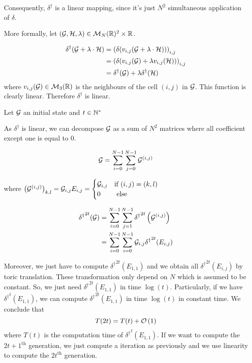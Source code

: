 Consequently, $\delta^\dagger$ is a linear mapping, since it's just $N^2$ simultaneous application of $\delta$.

More formally, let $(\mathcal{G},\mathcal{H},\lambda) \in \mathcal{M}_N(\mathbb{R})^2\times \mathbb{R}$.

$$
    \begin{aligned}
        \delta^\dagger(\mathcal{G}+\lambda\cdot\mathcal{H}) &= \left( \delta(v_{i,j}(\mathcal{G}+\lambda\cdot\mathcal{H})) \right)_{i,j}\\
        &= \left( \delta(v_{i,j}(\mathcal{G})+\lambda v_{i,j}(\mathcal{H})) \right)_{i,j}\\
        &= \delta^\dagger(\mathcal{G})+\lambda \delta^\dagger(\mathcal{H})
    \end{aligned}
$$
where $v_{i,j}(\mathcal{G}) \in \mathcal{M}_3(\mathbb{R})$ is the neighbours of the cell $(i,j)$ in $\mathcal{G}$. This function is clearly linear. Therefore $\delta^\dagger$ is linear.

Let $\mathcal{G}$ an initial state and $t\in\mathbb{N}^*$

As $\delta^\dagger$ is linear, we can decompose $\mathcal{G}$ as a sum of $N^2$ matrices where all coefficient except one is equal to 0. 

$$
    \mathcal{G}=\sum\limits_{i=0}^{N-1}\sum\limits_{j=0}^{N-1} \mathcal{G}^{(i,j)}
$$

where $\left(\mathcal{G}^{(i,j)}\right)_{k,l}=\mathcal{G}_{i,j}E_{i,j}=\begin{cases} \mathcal{G}_{i,j} & \text{if }(i,j)=(k,l)\\0&\text{ else} \end{cases}$

$$
    \begin{aligned}
        {\delta^\dagger}^{2t}(\mathcal{G}) &= \sum\limits_{i=0}^{N-1}\sum\limits_{j=1}^{N-1} {\delta^\dagger}^{2t}\left(\mathcal{G}^{(i,j)}\right)\\
        &= \sum\limits_{i=0}^{N-1} \sum\limits_{i=0}^{N-1} \mathcal{G}_{i,j} {\delta^\dagger}^{2t}(E_{i,j})
    \end{aligned}
$$

Moreover, we just have to compute ${\delta^\dagger}^{2t}(E_{1,1})$ and we obtain all ${\delta^\dagger}^{2t}(E_{i,j})$ by toric translation. These transformation only depend on $N$ which is assumed to be constant. So, we just need ${\delta^\dagger}^{2t}(E_{1,1})$ in time $\log(t)$. Particularly, if we have ${\delta^\dagger}^{t}(E_{1,1})$, we can compute ${\delta^\dagger}^{2t}(E_{1,1})$ in time $\log(t)$ in constant time. We conclude that
$$
    T(2t) = T(t) + \mathcal O \left( 1 \right)
$$
where $T(t)$ is the computation time of ${\delta^\dagger}^t(E_{1,1})$. If we want to compute the $2t+1^{\text{th}}$ generation, we just compute a iteration as previously and we use linearity to compute the $2t^{\text{th}}$ generation.

